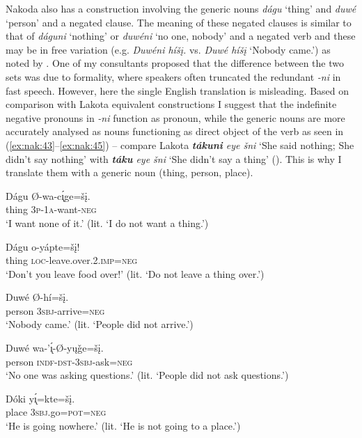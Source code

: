 \documentclass[output=paper,colorlinks,citecolor=brown]{langscibook}
\begin{document}
Nakoda also has a construction involving the generic nouns \textit{dágu} ‘thing’ and \textit{duwé} ‘person’ and a negated clause. The meaning of these negated clauses is similar to that of \textit{dáguni} ‘nothing’ or \textit{duwéni} ‘no one, nobody’ and a negated verb and these may be in free variation (e.g. \textit{Duwéni híšį.} vs. \textit{Duwé híšį} ‘Nobody came.’) as noted by \citet[361]{Cumberland2005}. One of my consultants proposed that the difference between the two sets was due to formality, where speakers often truncated the redundant \textit{-ni} in fast speech. However, here the single English translation is misleading. Based on comparison with Lakota equivalent constructions I suggest that the indefinite negative pronouns in \textit{-ni} function as pronoun, while the generic nouns are more accurately analysed as nouns functioning as direct object of the verb as seen in (\ref{ex:nak:43}--\ref{ex:nak:45}) -- compare Lakota \textit{\textbf{tákuni} eye šni} ‘She said nothing; She didn’t say nothing’ with \textit{\textbf{táku} eye šni} ‘She didn’t say a thing’ (\citealt[284]{UllrichBlackbear2018}). This is why I translate them with a generic noun (thing, person, place).

\ea\label{ex:nak:43}
    \ea\label{ex:nak:43a}
        \gll Dágu Ø-wa-c\'{\k{ı}}ge=šį. \\
             thing \textsc{3p-1a}-want-\textsc{neg} \\
        \glt ‘I want none of it.’ (lit. ‘I do not want a thing.’)
    
    \ex\label{ex:nak:43b}
        \gll Dágu o-yápte=šį!\\
             thing \textsc{loc}-leave.over.2.\textsc{imp=neg} \\
        \glt ‘Don’t you leave food over!’ (lit. ‘Do not leave a thing over.’)
    \z
\z 

\ea\label{ex:nak:44}
    \ea\label{ex:nak:44a}
        \gll Duwé Ø-hí=šį. \\
             person \textsc{3sbj}-arrive=\textsc{neg} \\
        \glt ‘Nobody came.’ (lit. ‘People did not arrive.’)
    
    \ex\label{ex:nak:44b}
        \gll Duwé wa-’\'{\k{ı}}-Ø-yųǧe=šį. \\
             person \textsc{indf-dst-3sbj}-ask=\textsc{neg} \\
        \glt ‘No one was asking questions.’ (lit. ‘People did not ask questions.’)
    \z
\z 

\ea\label{ex:nak:45}
    \gll Dóki y\'{\k{ı}}=kte=šį. \\
         place \textsc{3sbj.}go=\textsc{pot=neg} \\
    \glt ‘He is going nowhere.’ (lit. ‘He is not going to a place.’)
\z 
\end{document}
